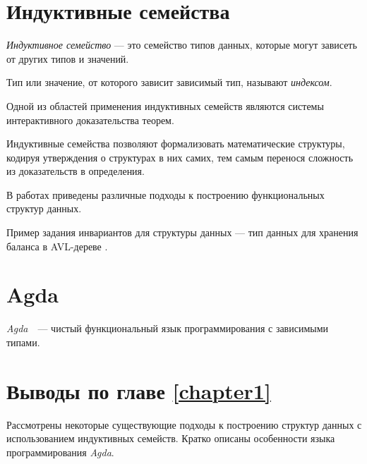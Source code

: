 \section{Индуктивные семейства}

\begin{definition}
\emph{Индуктивное семейство} \cite{DybjerIndFam}— это семейство типов данных,
которые могут зависеть от других типов и значений.

Тип или значение, от которого зависит зависимый тип, называют \emph{индексом}.
\end{definition}

Одной из областей применения индуктивных семейств являются системы интерактивного
доказательства теорем.

Индуктивные семейства позволяют формализовать математические структуры,
кодируя утверждения о структурах в них самих, тем самым перенося сложность из
доказательств в определения.

В работах \cite{OkasakiThesis, McBridePivotal} приведены различные подходы
к построению функциональных структур данных.

Пример задания инвариантов для
структуры данных — тип данных для хранения баланса в AVL-дереве \cite{AVLTree}.
\newline


\section{Agda}
\textit{Agda}~\cite{AgdaLang}~---  чистый функциональный язык программирования с зависимыми типами.


\section{Выводы по главе \ref{chapter1}}
Рассмотрены некоторые существующие подходы к построению структур данных
с использованием индуктивных семейств.
Кратко описаны особенности языка программирования \textit{Agda}.
